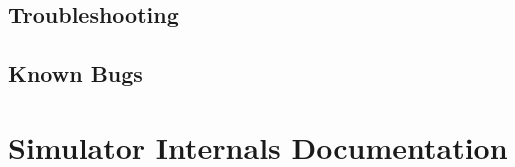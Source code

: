 \documentclass[letterpaper, 11pt, twoside]{article}
\begin{document}
\subsection{Troubleshooting}
\paragraph{}

\subsection{Known Bugs}
\paragraph{}

\cleardoublepage

\section[Internals]{Simulator Internals Documentation}

\end{document}

